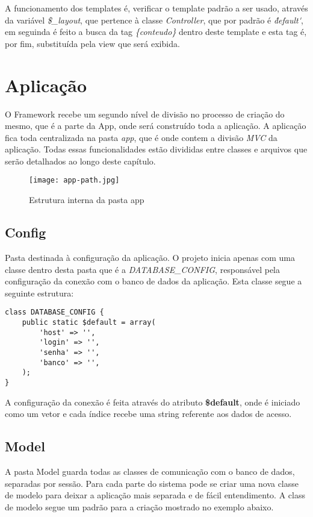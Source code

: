             A funcionamento dos templates é, verificar o template padrão a ser usado, através da variável \emph{\$\_layout}, que pertence à classe \emph{Controller}, que por padrão é \emph{\'default\'}, em seguinda é feito a busca da tag \emph{\{conteudo\}} dentro deste template e esta tag é, por fim, substituída pela view que será exibida.


    \section{Aplicação\label{sec:app}}

        O Framework recebe um segundo nível de divisão no processo de criação do mesmo, que é a parte da App, onde será construído toda a aplicação. A aplicação fica toda centralizada na pasta \emph{app}, que é onde contem a divisão \emph{MVC} da aplicação. Todas essas funcionalidades estão divididas entre classes e arquivos que serão detalhados ao longo deste capítulo.

    \begin{figure}[!htb]
        \centering
        \texttt{[image: app-path.jpg]}
        \caption{\small Estrutura interna da pasta app}
        \label{cap:sass}
    \end{figure}

        \subsection{Config\label{sec:app-config}}
            Pasta destinada à configuração da aplicação. O projeto inicia apenas com uma classe dentro desta pasta que é a \emph{DATABASE\_CONFIG}, responsável pela configuração da conexão com o banco de dados da aplicação. Esta classe segue a seguinte estrutura:


\begin{lstlisting}
class DATABASE_CONFIG {
    public static $default = array(
        'host' => '',
        'login' => '',
        'senha' => '',
        'banco' => '',
    );
}
\end{lstlisting}


            A configuração da conexão é feita através do atributo \textbf{\$default}, onde é iniciado como um vetor e cada índice recebe uma string referente aos dados de acesso.



        \subsection{Model\label{sec:app-model}}
            A pasta Model guarda todas as classes de comunicação com o banco de dados, separadas por sessão. Para cada parte do sistema pode se criar uma nova classe de modelo para deixar a aplicação mais separada e de fácil entendimento. A class de modelo segue um padrão para a criação mostrado no exemplo abaixo.

